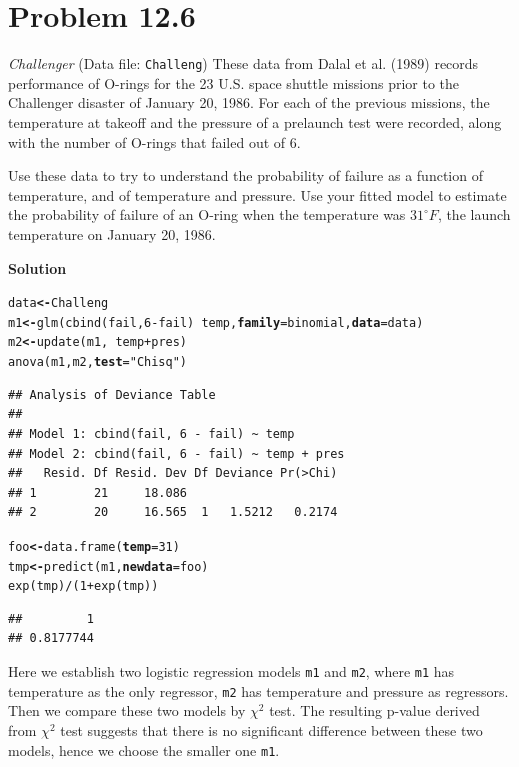\documentclass[12pt,oneside,a4paper]{article}\usepackage[]{graphicx}\usepackage[]{xcolor}
\makeatletter
\newcommand{\hlnum}[1]{\textcolor[rgb]{0,0,0}{#1}}%
\newcommand{\hlstr}[1]{\textcolor[rgb]{0,0,1}{#1}}%
\newcommand{\hlopt}[1]{\textcolor[rgb]{0,0,0}{#1}}%
\newcommand{\hlstd}[1]{\textcolor[rgb]{0,0,0}{#1}}%
\newcommand{\hlkwb}[1]{\textcolor[rgb]{0.498,0,0.333}{\textbf{#1}}}%
\newcommand{\hlkwc}[1]{\textcolor[rgb]{0.498,0,0.333}{\textbf{#1}}}%
\newcommand{\hlkwd}[1]{\textcolor[rgb]{0,0,0}{#1}}%
\newenvironment{kframe}{%
 \def\at@end@of@kframe{}%
 \ifinner\ifhmode%
  \def\at@end@of@kframe{\end{minipage}}%
  \begin{minipage}{\columnwidth}%
 \fi\fi%
 \def\FrameCommand##1{\hskip\@totalleftmargin \hskip-\fboxsep
 \colorbox{shadecolor}{##1}\hskip-\fboxsep
     \hskip-\linewidth \hskip-\@totalleftmargin \hskip\columnwidth}%
 \MakeFramed {\advance\hsize-\width
   \@totalleftmargin\z@ \linewidth\hsize
   \@setminipage}}%
 {\par\unskip\endMakeFramed%
 \at@end@of@kframe}
\newenvironment{knitrout}{}{} %
\newcommand{\problem}[1]
{
    \clearpage
    \section*{Problem {#1}}
}
\newcommand{\solution}
{
    \vspace{15pt}
    \noindent\ignorespaces\textbf{\large Solution}\par
}
\newcommand{\m}[1]{\texttt{{#1}}}
\makeatother
\begin{document}
\problem{12.6}
\emph{Challenger} (Data file: \m{Challeng}) These data from Dalal et al. (1989) records performance of O-rings for the 23 U.S. space shuttle missions prior to the Challenger disaster of January 20, 1986. For each of the previous missions, the temperature at takeoff and the pressure of a prelaunch test were recorded, along with the number of O-rings that failed out of 6.

Use these data to try to understand the probability of failure as a function of temperature, and of temperature and pressure. Use your fitted model to estimate the probability of failure of an O-ring when the temperature was $31^{\circ}F$, the launch temperature on January 20, 1986.

\solution
\begin{knitrout}
\color{fgcolor}\begin{kframe}
\begin{alltt}
\hlstd{data} \hlkwb{<-} \hlstd{Challeng}
\hlstd{m1} \hlkwb{<-} \hlkwd{glm}\hlstd{(}\hlkwd{cbind}\hlstd{(fail,} \hlnum{6} \hlopt{-} \hlstd{fail)} \hlopt{~} \hlstd{temp,} \hlkwc{family} \hlstd{= binomial,} \hlkwc{data} \hlstd{= data)}
\hlstd{m2} \hlkwb{<-} \hlkwd{update}\hlstd{(m1,} \hlopt{~} \hlstd{temp} \hlopt{+} \hlstd{pres)}
\hlkwd{anova}\hlstd{(m1, m2,} \hlkwc{test}\hlstd{=}\hlstr{"Chisq"}\hlstd{)}
\end{alltt}
\begin{verbatim}
## Analysis of Deviance Table
## 
## Model 1: cbind(fail, 6 - fail) ~ temp
## Model 2: cbind(fail, 6 - fail) ~ temp + pres
##   Resid. Df Resid. Dev Df Deviance Pr(>Chi)
## 1        21     18.086                     
## 2        20     16.565  1   1.5212   0.2174
\end{verbatim}
\begin{alltt}
\hlstd{foo} \hlkwb{<-} \hlkwd{data.frame}\hlstd{(}\hlkwc{temp} \hlstd{=} \hlnum{31}\hlstd{)}
\hlstd{tmp} \hlkwb{<-} \hlkwd{predict}\hlstd{(m1,} \hlkwc{newdata} \hlstd{= foo)}
\hlkwd{exp}\hlstd{(tmp)} \hlopt{/} \hlstd{(}\hlnum{1} \hlopt{+} \hlkwd{exp}\hlstd{(tmp))}
\end{alltt}
\begin{verbatim}
##         1 
## 0.8177744
\end{verbatim}
\end{kframe}
\end{knitrout}

Here we establish two logistic regression models \m{m1} and \m{m2}, where \m{m1} has temperature as the only regressor, \m{m2} has temperature and pressure as regressors. Then we compare these two models by $\chi^{2}$ test. The resulting p-value derived from $\chi^{2}$ test suggests that there is no significant difference between these two models, hence we choose the smaller one \m{m1}. 
\end{document}
